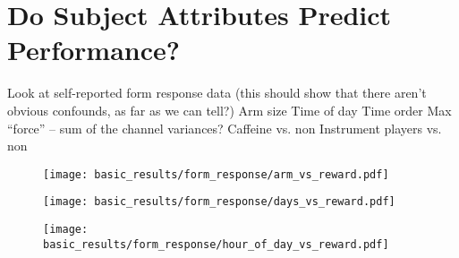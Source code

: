 \documentclass[../main.tex]{subfiles}
\begin{document}
% 



\section{Do Subject Attributes Predict Performance?}

Look at self-reported form response data (this should show that there aren’t obvious confounds, as far as we can tell?)
    Arm size
    Time of day
    Time order
    Max “force” – sum of the channel variances?
    Caffeine vs. non
    Instrument players vs. non

\begin{figure}[tph]
    \centering
    \texttt{[image: basic\_results/form\_response/arm\_vs\_reward.pdf]}
    \caption[Arm versus reward]{}\label{fig:arm_vs_reward}
\end{figure}

\begin{figure}[tph]
    \centering
    \texttt{[image: basic\_results/form\_response/days\_vs\_reward.pdf]}
    \caption[Experiment day versus reward]{}\label{fig:days_vs_reward}
\end{figure}

\begin{figure}[tph]
    \centering
    \texttt{[image: basic\_results/form\_response/hour\_of\_day\_vs\_reward.pdf]}
    \caption[Hour of day versus reward]{}\label{fig:hour_of_day_vs_reward}
\end{figure}
\end{document}
